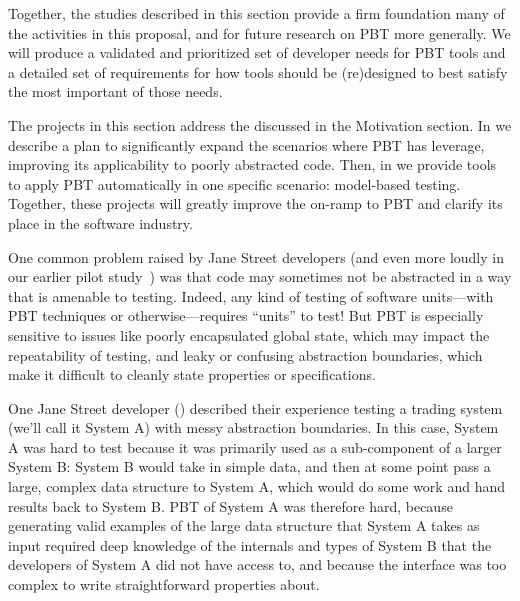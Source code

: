 
\smallskip

Together, the studies described in this section provide a firm foundation many
of the activities in this proposal, and for future research on PBT more
generally. We will produce a validated and prioritized set of developer needs
for PBT tools and a detailed set of requirements for how tools should be
(re)designed to best satisfy the most important of those needs.

The projects in this section address the 
discussed in the Motivation section.  In  we describe
a plan to significantly expand the scenarios where PBT has leverage, improving
its applicability to poorly abstracted code. Then, in
 we provide tools to apply PBT automatically in one
specific scenario: model-based testing.  Together, these projects will greatly
improve the on-ramp to PBT and clarify its place in the software industry.


One common problem raised by Jane Street developers (and even more loudly
in our earlier pilot study~\cite{ref:goldstein2022some}) was
that code may sometimes not be abstracted
in a way that is amenable to testing. Indeed, any kind of
testing of software units---with PBT techniques or otherwise---requires
``units'' to test!  But PBT is
especially sensitive to issues like poorly encapsulated global state, which may
impact the repeatability of testing, and leaky or confusing
abstraction boundaries, which make it difficult to cleanly state
properties or specifications.

One Jane Street developer () described their experience testing
a trading system (we'll call it System A) with messy abstraction boundaries. In
this case, System A was hard to test because it was primarily used as a
sub-component of a larger System B: System B would take in simple data, and then
at some point pass a large, complex data structure to System A, which would do
some work and hand results back to System B. PBT of System A was therefore hard,
because generating valid examples of the large data structure that System A
takes as input required deep knowledge of the internals and types of System B
that the developers of System A did not have access to, and because the
interface was too complex to write straightforward properties about.


